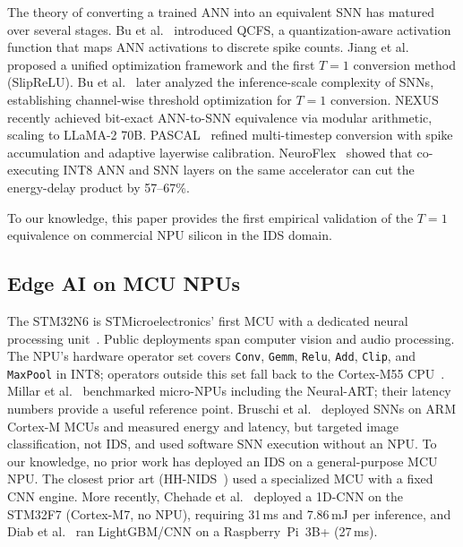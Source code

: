 \documentclass[10pt,twocolumn]{article}
\begin{document}
The theory of converting a trained ANN into an equivalent SNN has matured
over several stages. Bu et al.~\cite{bu2022optimal} introduced QCFS,
a quantization-aware activation function that maps ANN activations to
discrete spike counts.
Jiang et al.~\cite{jiang2023unified} proposed a unified optimization
framework and the first $T{=}1$ conversion method (SlipReLU).
Bu et al.~\cite{bu2025inference} later analyzed the inference-scale
complexity of SNNs, establishing channel-wise threshold optimization
for $T{=}1$ conversion.
NEXUS~\cite{nexus2026} recently achieved bit-exact ANN-to-SNN equivalence
via modular arithmetic, scaling to LLaMA-2 70B.
PASCAL~\cite{pascal2025} refined multi-timestep conversion with spike
accumulation and adaptive layerwise calibration.
NeuroFlex~\cite{neuroflex2025} showed that co-executing INT8 ANN and SNN
layers on the same accelerator can cut the energy-delay product by
57--67\%.

To our knowledge, this paper provides the first empirical validation
of the $T{=}1$ equivalence on commercial NPU silicon in the IDS domain.

\subsection{Edge AI on MCU NPUs}

The STM32N6 is STMicroelectronics' first MCU with a dedicated neural
processing unit~\cite{st_neural_art}. Public deployments span computer
vision and audio processing. The NPU's hardware operator set covers
\texttt{Conv}, \texttt{Gemm}, \texttt{Relu}, \texttt{Add}, \texttt{Clip},
and \texttt{MaxPool} in INT8; operators outside this set fall back to the
Cortex-M55 CPU~\cite{st_neural_art}.
Millar et al.~\cite{millar2025munpu} benchmarked micro-NPUs including the
Neural-ART; their latency numbers provide a useful reference point.
Bruschi et al.~\cite{bruschi2024snn_mcu} deployed SNNs on ARM Cortex-M
MCUs and measured energy and latency, but targeted image classification,
not IDS, and used software SNN execution without an NPU.
To our knowledge, no prior work has deployed an IDS on a general-purpose
MCU NPU. The closest prior art (HH-NIDS~\cite{ngo2022hhnids}) used
a specialized MCU with a fixed CNN engine.
More recently, Chehade et al.~\cite{chehade2025stm32} deployed a
1D-CNN on the STM32F7 (Cortex-M7, no NPU), requiring 31\,ms and
7.86\,mJ per inference, and Diab et al.~\cite{diab2025rpi} ran
LightGBM/CNN on a Raspberry~Pi~3B+ (27\,ms).

\end{document}
